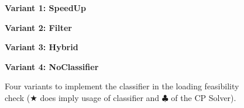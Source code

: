 \begin{figure}[ht]
    \centering

    \begin{minipage}[t]{0.45\textwidth}
        \textbf{Variant 1: SpeedUp}\par\vspace{0.5ex}
        \begin{algorithmic}[1]
            \EndWhile
        \end{algorithmic}
    \end{minipage}
    \hfill
    \begin{minipage}[t]{0.45\textwidth}
        \textbf{Variant 2: Filter}\par\vspace{0.5ex}
        \begin{algorithmic}[1]
            \EndWhile
        \end{algorithmic}
    \end{minipage}

    \vspace{2em} %

    \begin{minipage}[t]{0.45\textwidth}
        \textbf{Variant 3: Hybrid}\par\vspace{0.5ex}
        \begin{algorithmic}[1]
            \EndWhile
        \end{algorithmic}
    \end{minipage}
    \hfill
    \begin{minipage}[t]{0.45\textwidth}
        \textbf{Variant 4: NoClassifier}\par\vspace{0.5ex}
        \begin{algorithmic}[1]
            \EndWhile
        \end{algorithmic}
    \end{minipage}

    \vspace{1em}

    \caption[Four algorithm .]{Four variants to implement the classifier in the loading feasibility check ($\bigstar$
        does imply usage of classifier and $\clubsuit$ of the CP Solver).}
    \label{fig:four_variants}
\end{figure}
